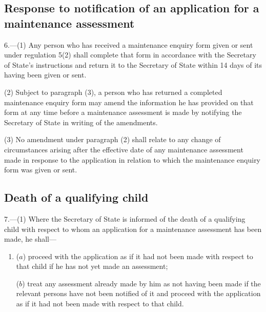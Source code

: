 \documentclass[a4paper,12pt]{article}
\begin{document}

\subsection[6. Response to notification of an application for a maintenance assessment]{\sloppy Response to notification of an application for a maintenance assessment}

6.—(1) Any person who has received a maintenance enquiry form given or sent under regulation 5(2) shall complete that form in accordance with the Secretary of State’s instructions and return it to the Secretary of State within 14 days of its having been given or sent.

(2) Subject to paragraph (3), a person who has returned a completed maintenance enquiry form may amend the information he has provided on that form at any time before a maintenance assessment is made by notifying the Secretary of State in writing of the amendments.

(3) No amendment under paragraph (2) shall relate to any change of circumstances arising after the effective date of any maintenance assessment made in response to the application in relation to which the maintenance enquiry form was given or sent.

\subsection[7. Death of a qualifying child]{Death of a qualifying child}

7.—(1) Where 
the Secretary of State  %
is informed of the death of a qualifying child with respect to whom an application for a maintenance assessment has been made, he shall—
\begin{enumerate}\item[]
($a$) proceed with the application as if it had not been made with respect to that child if he has not yet made an assessment;

($b$) treat any assessment already made by him as not having been made if the relevant persons have not been notified of it and proceed with the application as if it had not been made with respect to that child.
\end{enumerate}
\end{document}
